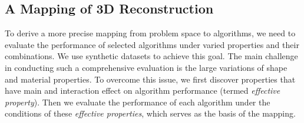 
\subsection{A Mapping of 3D Reconstruction}
To derive a more precise mapping from problem space to algorithms, we need to evaluate the performance of selected algorithms under varied properties and their combinations. We use synthetic datasets to achieve this goal. The main challenge in conducting such a comprehensive evaluation is the large variations of shape and material properties. To overcome this issue, we first discover properties that have main and interaction effect on algorithm performance (termed \textit{effective property}). Then we evaluate the performance of each algorithm under the conditions of these \textit{effective properties}, which serves as the basis of the mapping.




